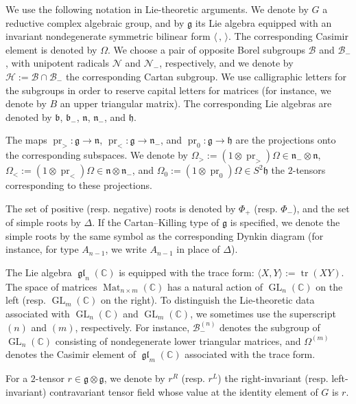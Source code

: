 \documentclass[11pt]{article}
\DeclareMathOperator{\gl}{\mathfrak{gl}}
\DeclareMathOperator{\Mat}{Mat}
\DeclareMathOperator{\GL}{GL}
\DeclareMathOperator{\pr}{pr}
\DeclareMathOperator{\tr}{tr}
\theoremstyle{definition}\newtheorem{definition}[theorem]{Definition}
\theoremstyle{definition}\newtheorem{remark}[theorem]{Remark}
\theoremstyle{remark}
\numberwithin{equation}{section}
\begin{document}
We use the following notation in Lie-theoretic arguments. We denote by $G$ a reductive complex algebraic group, and by $\mathfrak{g}$ its Lie algebra equipped with an invariant nondegenerate symmetric bilinear form $\langle\, ,\, \rangle$. The corresponding Casimir element is denoted by $\Omega$. We choose a pair of opposite Borel subgroups $\mathcal{B}$ and $\mathcal{B}_-$, with unipotent radicals $\mathcal{N}$ and $\mathcal{N}_-$, respectively, and we denote by $\mathcal{H}:=\mathcal{B}\cap \mathcal{B}_-$ the corresponding Cartan subgroup. We use calligraphic letters for the subgroups in order to reserve capital letters for matrices (for instance, we denote by $B$ an upper triangular matrix). The corresponding Lie algebras are denoted by $\mathfrak{b}$, $\mathfrak{b}_-$, $\mathfrak{n}$, $\mathfrak{n}_-$, and $\mathfrak{h}$. 

The maps $\pr_> : \mathfrak{g} \rightarrow \mathfrak{n}$, $\pr_< : \mathfrak{g} \rightarrow \mathfrak{n}_-$, and $\pr_0 : \mathfrak{g}\rightarrow \mathfrak{h}$ are the projections onto the corresponding subspaces. We denote by $\Omega_{>}:=(1\otimes \pr_>)\Omega \in \mathfrak{n}_-\otimes \mathfrak{n}$, $\Omega_{<} := (1\otimes \pr_<)\Omega \in \mathfrak{n}\otimes \mathfrak{n}_-$, and $\Omega_0:=(1\otimes \pr_0)\Omega \in S^2\mathfrak{h}$ the $2$-tensors corresponding to these projections.

The set of positive (resp. negative) roots is denoted by $\Phi_+$ (resp. $\Phi_-$), and the set of simple roots by $\Delta$. If the Cartan--Killing type of $\mathfrak{g}$ is specified, we denote the simple roots by the same symbol as the corresponding Dynkin diagram (for instance, for type $A_{n-1}$, we write $A_{n-1}$ in place of $\Delta$).

The Lie algebra $\gl_n(\mathbb{C})$ is equipped with the trace form: $\langle X,Y \rangle := \tr(XY)$. The space of matrices $\Mat_{n\times m}(\mathbb{C})$ has a natural action of $\GL_n(\mathbb{C})$ on the left (resp. $\GL_m(\mathbb{C})$ on the right). To distinguish the Lie-theoretic data associated with $\GL_n(\mathbb{C})$ and $\GL_m(\mathbb{C})$, we sometimes use the superscript $(n)$ and $(m)$, respectively. For instance, $\mathcal{B}_-^{(n)}$ denotes the subgroup of $\GL_n(\mathbb{C})$ consisting of nondegenerate lower triangular matrices, and $\Omega^{(m)}$ denotes the Casimir element of $\gl_m(\mathbb{C})$ associated with the trace form.

For a $2$-tensor $r \in \mathfrak{g}\otimes \mathfrak{g}$, we denote by $r^R$ (resp. $r^L$) the right-invariant (resp. left-invariant) contravariant tensor field whose value at the identity element of $G$ is $r$. 
\end{document}
